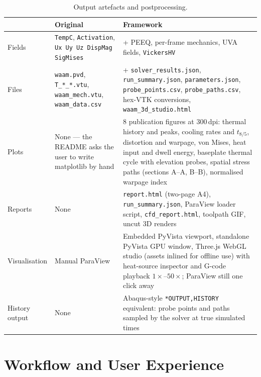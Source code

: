 \documentclass[10pt,a4paper]{article}
\newcommand{\code}[1]{\texttt{#1}}
\begin{document}
\begin{table}[h!]
\centering
\caption{Output artefacts and postprocessing.}
\label{tab:out}
\small
\begin{tabularx}{\linewidth}{@{}l X X@{}}
\toprule
& \textbf{Original} & \textbf{Framework} \\
\midrule
Fields & \code{TempC}, \code{Activation}, \code{Ux Uy Uz DispMag SigMises} &
+ PEEQ, per-frame mechanics, UVA fields, \code{VickersHV} \\
\addlinespace
Files & \code{waam.pvd}, \code{T\_*\_*.vtu}, \code{waam\_mech.vtu},
\code{waam\_data.csv} & + \code{solver\_results.json},
\code{run\_summary.json}, \code{parameters.json}, \code{probe\_points.csv},
\code{probe\_paths.csv}, hex-VTK conversions, \code{waam\_3d\_studio.html} \\
\addlinespace
Plots & None --- the README asks the user to write matplotlib by hand &
8 publication figures at 300\,dpi: thermal history and peaks, cooling rates
and $t_{8/5}$, distortion and warpage, von Mises, heat input and dwell energy,
baseplate thermal cycle with elevation probes, spatial stress paths (sections
A--A, B--B), normalised warpage index \\
\addlinespace
Reports & None & \code{report.html} (two-page A4), \code{run\_summary.json},
ParaView loader script, \code{cfd\_report.html}, toolpath GIF, uncut 3D
renders \\
\addlinespace
Visualisation & Manual ParaView & Embedded PyVista viewport, standalone
PyVista GPU window, Three.js WebGL studio (assets inlined for offline use) with
heat-source inspector and G-code playback $1\times$--$50\times$; ParaView still
one click away \\
\addlinespace
History output & None & Abaqus-style \code{*OUTPUT,HISTORY} equivalent:
probe points and paths sampled by the solver at true simulated times \\
\bottomrule
\end{tabularx}
\end{table}

\section{Workflow and User Experience}
\end{document}
